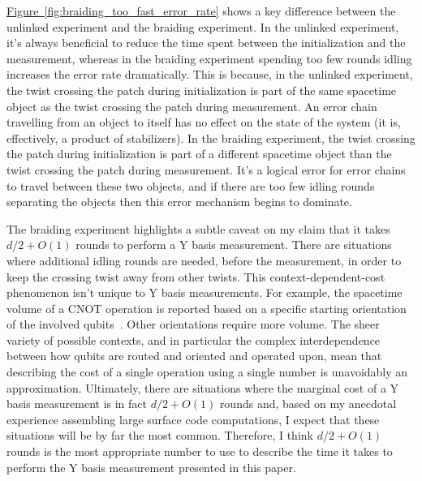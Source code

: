 \documentclass[onecolumn,unpublished,a4paper]{quantumarticle}
\theoremstyle{definition}
\theoremstyle{definition}
\theoremstyle{definition}
\newcommand{\fig}[1]{\hyperref[fig:#1]{Figure~\ref*{fig:#1}}}
\begin{document}
\fig{braiding_too_fast_error_rate} shows a key difference between the unlinked experiment and the braiding experiment.
In the unlinked experiment, it's always beneficial to reduce the time spent between the initialization and the measurement, whereas in the braiding experiment spending too few rounds idling increases the error rate dramatically.
This is because, in the unlinked experiment, the twist crossing the patch during initialization is part of the same spacetime object as the twist crossing the patch during measurement.
An error chain travelling from an object to itself has no effect on the state of the system (it is, effectively, a product of stabilizers).
In the braiding experiment, the twist crossing the patch during initialization is part of a different spacetime object than the twist crossing the patch during measurement.
It's a logical error for error chains to travel between these two objects, and if there are too few idling rounds separating the objects then this error mechanism begins to dominate.

The braiding experiment highlights a subtle caveat on my claim that it takes $d/2 + O(1)$ rounds to perform a Y basis measurement.
There are situations where additional idling rounds are needed, before the measurement, in order to keep the crossing twist away from other twists.
This context-dependent-cost phenomenon isn't unique to Y basis measurements.
For example, the spacetime volume of a CNOT operation is reported based on a specific starting orientation of the involved qubits~\cite{horsman2012latticesurgery}.
Other orientations require more volume.
The sheer variety of possible contexts, and in particular the complex interdependence between how qubits are routed and oriented and operated upon, mean that describing the cost of a single operation using a single number is unavoidably an approximation.
Ultimately, there are situations where the marginal cost of a Y basis measurement is in fact $d/2 + O(1)$ rounds and, based on my anecdotal experience assembling large surface code computations, I expect that these situations will be by far the most common.
Therefore, I think $d/2 + O(1)$ rounds is the most appropriate number to use to describe the time it takes to perform the Y basis measurement presented in this paper.
\end{document}
